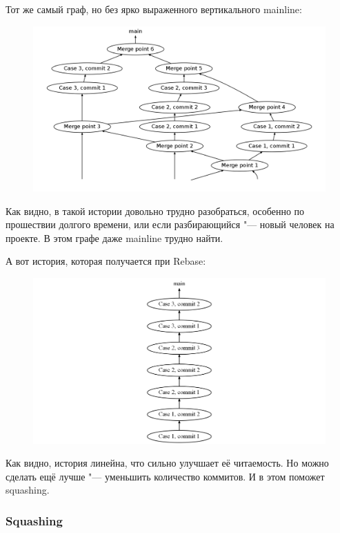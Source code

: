 \documentclass[10pt, a5paper]{article}
\begin{document}
Тот же самый граф, но без ярко выраженного вертикального mainline:
\begin{figure}[h!]
  \centering
  \includegraphics[scale=0.2]{02_2014_main-merged-weak-mainline.png}
\end{figure}

Как видно, в такой истории довольно трудно разобраться, особенно по прошествии долгого времени, или если разбирающийся "--- новый человек на проекте. В этом графе даже mainline трудно найти.

А вот история, которая получается при Rebase:
\begin{figure}[h!]
  \centering
  \includegraphics[scale=0.2]{02_2014_main-ordered.png}
\end{figure}

Как видно, история линейна, что сильно улучшает её читаемость. Но можно сделать ещё лучше "--- уменьшить количество коммитов. И в этом поможет squashing.

\subsubsection*{Squashing}
\end{document}
